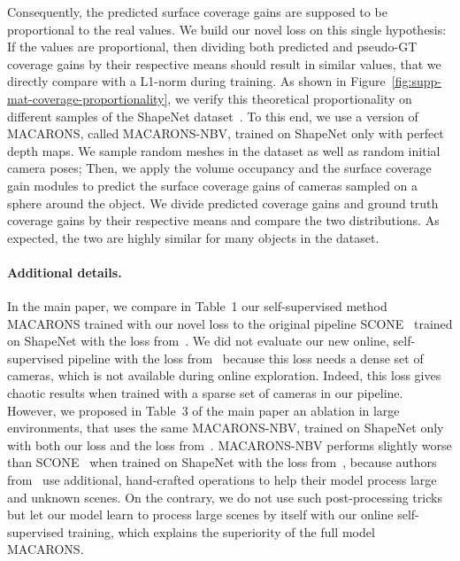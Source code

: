 Consequently, the predicted surface coverage gains are supposed to be proportional to the real values. We build our novel loss on this single hypothesis: If the values are proportional, then dividing both predicted and pseudo-GT coverage gains by their respective means should result in similar values, that we directly compare with a L1-norm during training.
As shown in Figure~\ref{fig:supp-mat-coverage-proportionality}, we verify this theoretical proportionality on different samples of the ShapeNet dataset~\cite{chang-15-shapenet}. To this end, we use a version of MACARONS, called MACARONS-NBV, trained on ShapeNet only with perfect depth maps. We sample random meshes in the dataset as well as random initial camera poses; Then, we apply the volume occupancy and the surface coverage gain modules to predict the surface coverage gains of cameras sampled on a sphere around the object. We divide predicted coverage gains and ground truth coverage gains by their respective means and compare the two distributions. As expected, the two are highly similar for many objects in the dataset.

\paragraph{Additional details.} In the main paper, we compare in Table~1 our self-supervised method MACARONS trained with our novel loss to the original pipeline SCONE~\cite{guedon-nips22-scone-surface-coverage} trained on ShapeNet with the loss from~\cite{guedon-nips22-scone-surface-coverage}. We did not evaluate our new online, self-supervised pipeline with the loss from~\cite{guedon-nips22-scone-surface-coverage} because this loss needs a dense set of cameras, which is not available during online exploration. Indeed, this loss gives chaotic results when trained with a sparse set of cameras in our pipeline.
However, we proposed in Table~3 of the main paper an ablation in large environments, that uses the same MACARONS-NBV, trained on ShapeNet only with both our loss and the loss from~\cite{guedon-nips22-scone-surface-coverage}. MACARONS-NBV performs slightly worse than SCONE~\cite{guedon-nips22-scone-surface-coverage} when trained on ShapeNet with the loss from~\cite{guedon-nips22-scone-surface-coverage}, because authors from~\cite{guedon-nips22-scone-surface-coverage} use additional, hand-crafted operations to help their model process large and unknown scenes. On the contrary, we do not use such post-processing tricks but let our model learn to process large scenes by itself with our online self-supervised training, which explains the superiority of the full model MACARONS.

